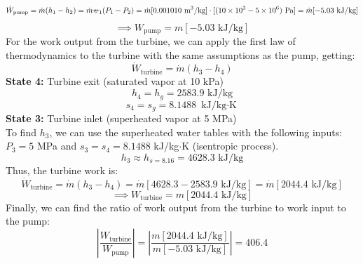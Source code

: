 \documentclass[12pt]{article}
\newcommand{\svol}{%
  \mathord{\text{\ooalign{%
    \hfil$v$\hfil\cr
    \hfil\rule[0.6ex]{0.8em}{0.5pt}\hfil
  }}}%
}
\begin{document}
\[\dot{W}_\text{pump} = \dot{m}(h_1 - h_2) = \dot{m}\svol_1 (P_1 - P_2) = \dot{m} [0.001010 \text{ m$^3$/kg}] \cdot [(10\times10^3 - 5\times10^6) \text{ Pa}] = \dot{m} [-5.03 \text{ kJ/kg}]\]
\[\implies W_\text{pump} = m[-5.03 \text{ kJ/kg}]\]
For the work output from the turbine, we can apply the first law of thermodynamics to the turbine with the same assumptions as the pump, getting:
\[\dot{W}_\text{turbine} = \dot{m}(h_3 - h_4)\]
\textbf{State 4:} Turbine exit (saturated vapor at 10 kPa)
\[h_4 = h_g = 2583.9 \text{ kJ/kg}\]
\[s_4 = s_g = 8.1488 \text{ kJ/kg$\cdot$K}\]
\textbf{State 3:} Turbine inlet (superheated vapor at 5 MPa)\\
To find $h_3$, we can use the superheated water tables with the following inputs: $P_3 = 5$ MPa and $s_3 = s_4 = 8.1488$ kJ/kg$\cdot$K (isentropic process). 
\[h_3 \approx h_{s=8.16}=4628.3 \text{ kJ/kg}\]
Thus, the turbine work is:
\[\dot{W}_\text{turbine} = \dot{m}(h_3 - h_4) = \dot{m} [4628.3 - 2583.9 \text{ kJ/kg}] = \dot{m} [2044.4 \text{ kJ/kg}]\]
\[\implies W_\text{turbine} = m[2044.4 \text{ kJ/kg}]\]
Finally, we can find the ratio of work output from the turbine to work input to the pump:
\[\left|\frac{W_\text{turbine}}{W_\text{pump}}\right| = \left|\frac{m[2044.4 \text{ kJ/kg}]}{m[-5.03 \text{ kJ/kg}]}\right| = \boxed{406.4}\]
\end{document}
